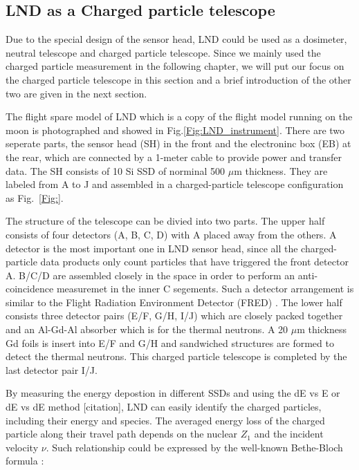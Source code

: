 \subsection{LND as a Charged particle telescope}

Due to the special design of the sensor head, \ac{LND} could be used as a dosimeter, neutral telescope and charged particle telescope. Since we mainly used the charged particle measurement in the following chapter, we will put our focus on the charged particle telescope in this section and a brief introduction of the other two are given in the next section.

The flight spare model of \ac{LND} which is a copy of the flight model running on the moon is photographed and showed in Fig.\ref{Fig:LND_instrument}. There are two seperate parts, the sensor head (SH) in the front and the electroninc box (EB) at the rear, which are connected by a 1-meter cable to provide power and transfer data. 
The SH consists of 10 Si \acs{SSD} of norminal 500 $\mu$m thickness. They are labeled from A to J and assembled in a charged-particle telescope configuration as Fig.~\ref{Fig:}.

The structure of the telescope can be divied into two parts. The upper half consists of four detectors (A, B, C, D) with A placed away from the others. A detector is the most important one in \ac{LND} sensor head, since all the charged-particle data products only count particles that have triggered the front detector A. B/C/D are assembled closely in the space in order to perform an anti-coincidence measuremet in the inner C segements. Such a detector arrangement is similar to the Flight Radiation Environment Detector (FRED) \citep{moeller-etal-2013, moeller-etal-2013b}. The lower half consists three detector pairs (E/F, G/H, I/J) which are closely packed together and an Al-Gd-Al absorber which is for the thermal neutrons. A 20 $\mu$m thickness Gd foils is insert into E/F and G/H and sandwiched structures are formed to detect the thermal neutrons. This charged particle telescope is completed by the last detector pair I/J.

By measuring the energy depostion in different \acp{SSD} and using the dE vs E or dE vs dE method [citation], LND can easily identify the charged particles, including their energy and species. 
The averaged energy loss of the charged particle along their travel path depends on the nuclear $Z_1$ and the incident velocity $\nu$. Such relationship could be expressed by the well-known Bethe-Bloch formula \citep{bethe-1930, bloch-1933}:

